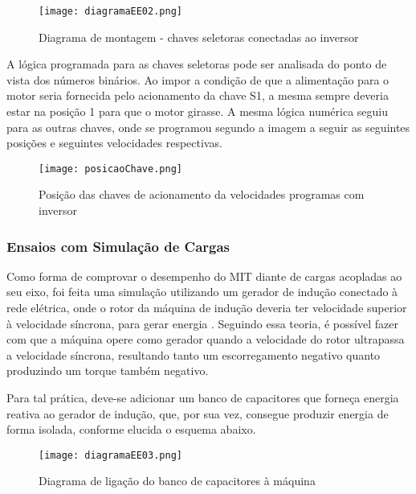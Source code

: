 		\newpage
		\begin{figure}[!h]
			\centering
			\texttt{[image: diagramaEE02.png]}
			\caption[Diagrama de montagem - chaves seletoras conectadas ao inversor]{Diagrama de montagem - chaves seletoras conectadas ao inversor \cite{WEGIF}} 
			\label{diagramaEE02}
		\end{figure}

		A lógica programada para as chaves seletoras pode ser analisada do ponto de vista dos números binários. Ao impor a condição de que a alimentação para o motor seria fornecida pelo acionamento da chave S1, a mesma sempre deveria estar na posição 1 para que o motor girasse. A mesma lógica numérica seguiu para as outras chaves, onde se programou segundo a imagem a seguir as seguintes posições e seguintes velocidades respectivas.

		\begin{figure}[!h]
			\centering
			\texttt{[image: posicaoChave.png]}
			\caption[Posição das chaves de acionamento da velocidades programas com inversor]{Posição das chaves de acionamento da velocidades programas com inversor} 
			\label{posicaoChave}
		\end{figure}

	\subsubsection{Ensaios com Simulação de Cargas}


			Como forma de comprovar o desempenho do MIT diante de cargas acopladas ao seu eixo, foi feita uma simulação utilizando um gerador de indução conectado à rede elétrica, onde o rotor da máquina de indução deveria ter velocidade superior à velocidade síncrona, para gerar energia \cite{Nascimento}. Seguindo essa teoria, é possível fazer com que a máquina opere como gerador quando a velocidade do rotor ultrapassa a velocidade síncrona, resultando tanto um escorregamento negativo quanto produzindo um torque também negativo.
			
			Para tal prática, deve-se adicionar um banco de capacitores que forneça energia reativa ao gerador de indução, que, por sua vez, consegue produzir energia de forma isolada, conforme elucida o esquema abaixo.

			\begin{figure}[!h]
				\centering
				\texttt{[image: diagramaEE03.png]}
				\caption[Diagrama de ligação do banco de capacitores à máquina]{Diagrama de ligação do banco de capacitores à máquina \cite{Nascimento}} 
				\label{diagramaEE03}
			\end{figure}

